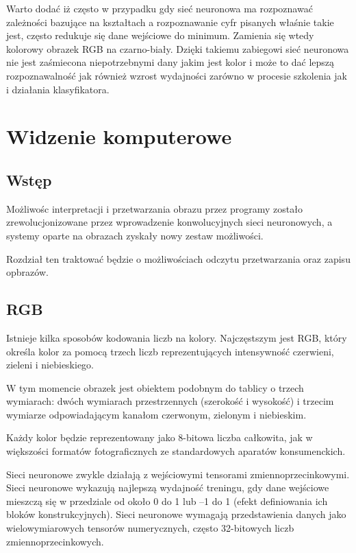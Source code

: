 \documentclass[brudnopis]{xmgr}
\begin{document}
 Warto dodać iż często w przypadku gdy sieć neuronowa ma rozpoznawać zależności bazujące na kształtach a rozpoznawanie cyfr pisanych właśnie takie jest, często redukuje się dane wejściowe do minimum. Zamienia się wtedy kolorowy obrazek RGB na czarno-biały. Dzięki takiemu zabiegowi sieć neuronowa nie jest zaśmiecona niepotrzebnymi dany jakim jest kolor i może to dać lepszą rozpoznawalność jak również wzrost wydajności zarówno w procesie szkolenia jak i działania klasyfikatora.  


\chapter{Widzenie komputerowe  }

\section{Wstęp\label{s:dsssl}}
Możliwośc interpretacji i przetwarzania obrazu przez programy zostało zrewolucjonizowane
przez wprowadzenie konwolucyjnych sieci neuronowych, a systemy oparte na obrazach zyskały nowy zestaw możliwości. 

Rozdział ten traktować będzie o możliwościach odczytu przetwarzania oraz zapisu opbrazów.

 \section{RGB\label{s:dsssl}}
 Istnieje kilka sposobów kodowania liczb na kolory. Najczęstszym jest
RGB, który określa kolor za pomocą trzech liczb reprezentujących intensywność czerwieni, zieleni i niebieskiego. 

W tym momencie obrazek jest obiektem podobnym do tablicy o trzech wymiarach: dwóch wymiarach przestrzennych (szerokość i wysokość) i trzecim wymiarze odpowiadającym kanałom czerwonym, zielonym i niebieskim. 

Każdy kolor będzie reprezentowany jako 8-bitowa liczba całkowita, jak w większości formatów fotograficznych ze standardowych aparatów konsumenckich.

Sieci neuronowe zwykle działają z wejściowymi tensorami zmiennoprzecinkowymi. Sieci neuronowe wykazują najlepszą wydajność treningu, gdy dane wejściowe mieszczą się w przedziale od około 0 do 1 lub –1 do 1 (efekt definiowania ich bloków konstrukcyjnych). Sieci neuronowe wymagają przedstawienia danych jako wielowymiarowych tensorów numerycznych, często 32-bitowych liczb zmiennoprzecinkowych.
\end{document}
